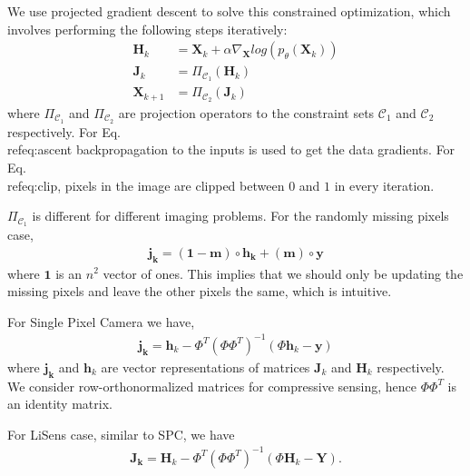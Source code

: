 \documentclass[journal,twoside]{IEEEtran}
\newcommand{\X}{\mathbf{X}}
\newcommand{\Y}{\mathbf{Y}}
\begin{document}

We use projected gradient descent to solve this constrained optimization, which involves performing the following steps iteratively:
\begin{align}
\label{eq:ascent}
\mathbf{H}_k &= \X_{k} + \alpha \nabla_{\X} log(p_{\theta}(\X_k))\\
\label{eq:project}
\mathbf{J}_k &= \Pi_{\mathcal{C}_1}(\mathbf{H}_k)\\
\label{eq:clip}
\mathbf{X}_{k+1} &= \Pi_{\mathcal{C}_2}(\mathbf{J}_{k})
\end{align}
where $\Pi_{\mathcal{C}_1}$ and $\Pi_{\mathcal{C}_2}$ are projection operators to the constraint sets $\mathcal{C}_1$ and $\mathcal{C}_2$ respectively. For Eq.\\ref{eq:ascent} backpropagation to the inputs is used to get the data gradients. For Eq.\\ref{eq:clip}, pixels in the image are clipped between $0$ and $1$ in every iteration. 

$\Pi_{\mathcal{C}_1}$ is different for different imaging problems. For the randomly missing pixels case, 
\begin{align}
\label{eq:proj_inpaint}
\mathbf{j_k} = (\mathbf{1} - \mathbf{m}) \circ \mathbf{h_k} + (\mathbf{m}) \circ \mathbf{y}
\end{align}
where $\mathbf{1}$ is an $n^2$ vector of ones. This implies that we should only be updating the missing pixels and leave the other pixels the same, which is intuitive. 

For Single Pixel Camera we have,
\begin{align}
\label{eq:proj_spc}
\mathbf{j_k} = \mathbf{h}_k-\Phi^T\left(\Phi\Phi^T\right)^{-1}\left(\Phi\mathbf{h}_k-\mathbf{y}\right)
\end{align}
where $\mathbf{j_k}$ and $\mathbf{h}_k$ are vector representations of matrices $\mathbf{J}_k$ and $\mathbf{H}_k$ respectively. We consider row-orthonormalized matrices for compressive sensing, hence $\Phi\Phi^T$ is an identity matrix.

For LiSens case, similar to SPC, we have 
\begin{align}
\label{eq:proj_lisens}
    \mathbf{J_k} = \mathbf{H}_k-\Phi^T\left(\Phi\Phi^T\right)^{-1}\left(\Phi\mathbf{H}_k-\Y\right).
\end{align}
\end{document}
